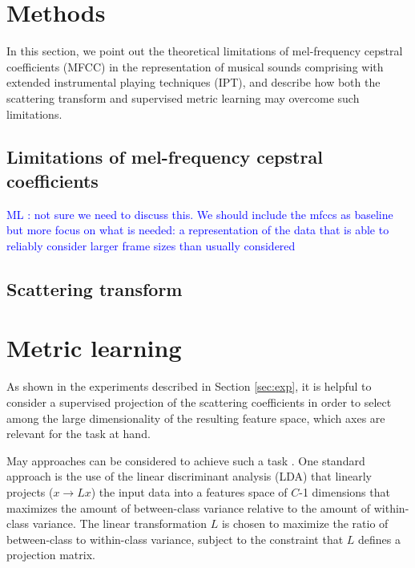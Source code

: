 \documentclass{article}
\newcommand{\ml}[1]{\textcolor{blue}{ML : #1}}
\begin{document}
\section{Methods}
In this section, we point out the theoretical limitations of mel-frequency cepstral coefficients (MFCC) in the representation of musical sounds comprising with extended instrumental playing techniques (IPT), and describe how both the scattering transform and supervised metric learning may overcome such limitations.

\subsection{Limitations of mel-frequency cepstral coefficients}

\ml{not sure we need to discuss this. We should include the mfccs as baseline but more focus on what is needed: a representation of the data that is able to reliably consider larger frame sizes than usually considered}

\subsection{Scattering transform} %
\cite{anden2012dafx}

\section{Metric learning} %

As shown in the experiments described in Section \ref{sec:exp}, it is helpful to consider a supervised projection of the scattering coefficients in order to select among the large dimensionality of the resulting feature space, which axes are relevant for the task at hand.

May approaches can be considered to achieve such a task \cite{}. One standard approach is the use of the linear discriminant analysis (LDA) that linearly projects ($x \rightarrow L x$) the input data into a features space of $C$-1 dimensions that maximizes the amount of between-class variance
relative to the amount of within-class variance. The linear transformation $L$ is chosen to maximize the ratio of between-class to within-class variance,
subject to the constraint that $L$ defines a projection matrix.
\end{document}
